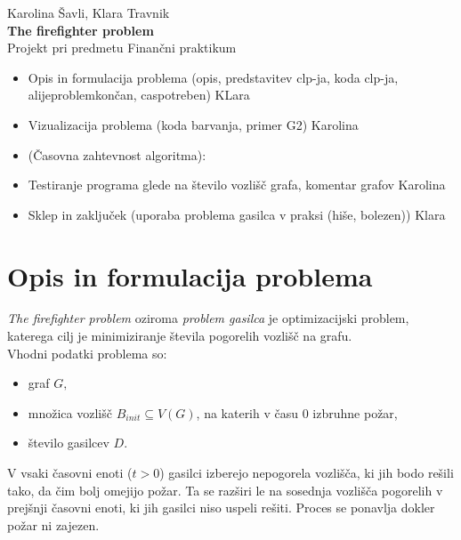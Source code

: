 \documentclass[a4paper, 12pt]{article}
\begin{document}
    
\thispagestyle{empty}
\vfill

\begin{center}{\large
Karolina Šavli, Klara Travnik\\[5mm]
{\Huge \bf The firefighter problem}\\[5mm]
Projekt pri predmetu Finančni praktikum\\[1cm]}
\end{center}
\vfill

\pagebreak


\tableofcontents

\pagebreak



\begin{itemize}
    \item Opis in formulacija problema (opis, predstavitev clp-ja, koda clp-ja, alijeproblemkončan, caspotreben) KLara
    \item Vizualizacija problema (koda barvanja, primer G2) Karolina
    \item (Časovna zahtevnost algoritma): 
    \item Testiranje programa glede na število vozlišč grafa, komentar grafov Karolina
    \item Sklep in zaključek (uporaba problema gasilca v praksi (hiše, bolezen)) Klara
\end{itemize}


\pagebreak

\section{Opis in formulacija problema}

\noindent \emph{The firefighter problem} oziroma \emph{problem gasilca} je optimizacijski problem, katerega cilj je 
minimiziranje števila pogorelih vozlišč na grafu. \\
Vhodni podatki problema so:
\begin{itemize}
    \item graf $G,$
    \item množica vozlišč $B_{init} \subseteq V\left(G\right)$, na katerih v času $0$ izbruhne požar,
    \item število gasilcev $D$.
\end{itemize} 
V vsaki časovni enoti ($t > 0$) gasilci izberejo nepogorela vozlišča, ki jih bodo rešili tako,
da čim bolj omejijo požar. Ta se razširi le na sosednja vozlišča pogorelih v prejšnji časovni enoti,
ki jih gasilci niso uspeli rešiti. Proces se ponavlja dokler požar ni zajezen.
\end{document}
